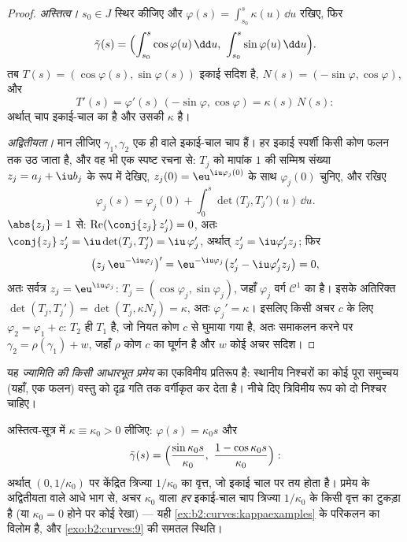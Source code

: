 \begin{proof}
\emph{अस्तित्व।} $s_0 \in J$ स्थिर कीजिए और $\varphi(s) =
\int_{s_0}^s \kappa(u)\,\dd u$ रखिए, फिर
\[
\tilde\gamma(s) = \Bigl(\int_{s_0}^s \cos\varphi(u)\,\dd u,\
\int_{s_0}^s \sin\varphi(u)\,\dd u\Bigr).
\]
तब $T(s) = (\cos\varphi(s), \sin\varphi(s))$ इकाई सदिश है,
$N(s) = (-\sin\varphi, \cos\varphi)$, और
\[
T'(s) = \varphi'(s)\,(-\sin\varphi, \cos\varphi)
= \kappa(s)\,N(s) :
\]
अर्थात् चाप इकाई-चाल का है और उसकी  $\kappa$ है।

\emph{अद्वितीयता।} मान लीजिए $\gamma_1, \gamma_2$ एक ही  वाले इकाई-चाल
चाप हैं। हर इकाई स्पर्शी किसी कोण फलन तक उठ जाता है, और वह भी एक
स्पष्ट रचना से: $T_j$ को मापांक $1$ की सम्मिश्र
संख्या $z_j = a_j + \iu b_j$ के रूप में देखिए, $z_j(0) = \eu^{\iu\varphi_j(0)}$ के साथ
$\varphi_j(0)$ चुनिए, और रखिए
\[
\varphi_j(s) = \varphi_j(0) + \int_0^s\det\bigl(T_j,
T_j'\bigr)(u)\,\dd u .
\]
$\abs{z_j} = 1$ से: $\operatorname{Re}(\conj{z_j}\,z_j') =
0$, अतः $\conj{z_j}\,z_j' = \iu\det(T_j, T_j') =
\iu\,\varphi_j'$, अर्थात् $z_j' = \iu\varphi_j'z_j$; फिर
\[
\bigl(z_j\,\eu^{-\iu\varphi_j}\bigr)'
= \eu^{-\iu\varphi_j}\bigl(z_j' - \iu\varphi_j'z_j\bigr) = 0,
\]
अतः सर्वत्र $z_j = \eu^{\iu\varphi_j}$: $T_j =
(\cos\varphi_j, \sin\varphi_j)$, जहाँ $\varphi_j$ वर्ग
$\mathcal C^1$ का है। इसके अतिरिक्त $\det(T_j, T_j') = \det(T_j,
\kappa N_j) = \kappa$, अतः $\varphi_j' = \kappa$। इसलिए किसी
अचर $c$ के लिए $\varphi_2 = \varphi_1 + c$: $T_2$ ही $T_1$ है, जो नियत कोण $c$ से घुमाया गया है, अतः
समाकलन करने पर $\gamma_2 = \rho(\gamma_1) + w$, जहाँ $\rho$ कोण $c$ का
घूर्णन है और $w$ कोई अचर सदिश।
\end{proof}

\begin{remark}
यह \emph{ज्यामिति की किसी आधारभूत प्रमेय} का एकविमीय प्रतिरूप है:
स्थानीय निश्चरों का कोई पूरा समुच्चय (यहाँ, एक फलन) वस्तु को दृढ़ गति
तक वर्गीकृत कर देता है। नीचे दिए त्रिविमीय रूप को दो निश्चर चाहिए।
\end{remark}

\begin{example}[अचर वक्रता का अर्थ है
वृत्त]\label{ex:b2:curves:constantkappa}
अस्तित्व-सूत्र में $\kappa \equiv \kappa_0 > 0$ लीजिए:
$\varphi(s) = \kappa_0 s$ और
\[
\tilde\gamma(s) = \Bigl(\frac{\sin\kappa_0s}{\kappa_0},\
\frac{1 - \cos\kappa_0s}{\kappa_0}\Bigr) :
\]
अर्थात् $(0,
1/\kappa_0)$ पर केंद्रित त्रिज्या $1/\kappa_0$ का वृत्त, जो इकाई चाल पर तय होता है। प्रमेय के
अद्वितीयता वाले आधे भाग से, अचर  $\kappa_0$ वाला \emph{हर}
इकाई-चाल चाप त्रिज्या $1/\kappa_0$ के किसी वृत्त का टुकड़ा है
(या $\kappa_0 = 0$ होने पर कोई रेखा) --- यही \cref{ex:b2:curves:kappaexamples} के परिकलन
का विलोम है, और \cref{exo:b2:curves:9} की समतल स्थिति।
\end{example}

